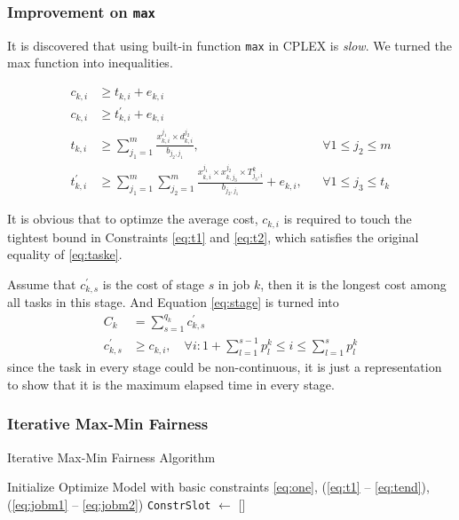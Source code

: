\documentclass[aspectratio=169]{beamer}
\begin{document}
\begin{frame}[allowframebreaks=0.8]
\frametitle{Improvement on \texttt{max}}
It is discovered that using built-in function \texttt{max} in CPLEX is \emph{slow}. We turned the max function into inequalities. 

\begin{align}
    c_{k,i} &\geq t_{k,i} + e_{k,i} \label{eq:t1}\\
    c_{k,i} &\geq t_{k,i}^\prime + e_{k,i} \label{eq:t2}\\
    t_{k,i} &\geq \sum_{j_1=1}^m \frac{x_{k,i}^{j_1}\times d_{k,i}^{j_2}}{b_{j_2,j_1}},&& \forall 1\leq j_2\leq m\\
    t_{k,i}^\prime &\geq \sum_{j_1=1}^m\sum_{j_2=1}^m \frac{x_{k,i}^{j_1}\times x_{k,j_3}^{j_2}\times T_{j_3,i}^k}{b_{j_2,j_1}} + e_{k,i},&& \forall 1\leq j_3\leq t_k\label{eq:tend}
\end{align}

It is obvious that to optimze the average cost, $c_{k,i}$ is required to touch the tightest bound in Constraints \eqref{eq:t1} and \eqref{eq:t2}, which satisfies the original equality of \eqref{eq:taske}.

Assume that $c^\prime_{k,s}$ is the cost of stage $s$ in job $k$, then it is the longest cost among all tasks in this stage. And Equation \eqref{eq:stage} is turned into
\begin{align}
    C_k &= \sum_{s=1}^{q_k} c^{\prime}_{k,s} \label{eq:jobm1}\\
    c^\prime_{k,s} &\geq c_{k,i},\quad \forall i: 1+\sum_{l=1}^{s-1} p_{l}^k \leq i \leq \sum_{l=1}^{s} p_{l}^k \label{eq:jobm2}
\end{align}
since the task in every stage could be non-continuous, it is just a representation to show that it is the maximum elapsed time in every stage.
\end{frame}

\begin{frame}
\frametitle{Iterative Max-Min Fairness}

\begin{algorithm}[H]
    \caption{Iterative Max-Min Fairness Algorithm}
    Initialize Optimize Model with basic constraints \eqref{eq:one}, (\ref{eq:t1} -- \ref{eq:tend}), (\ref{eq:jobm1} -- \ref{eq:jobm2})\;
    \texttt{ConstrSlot} $\leftarrow$ []\;
\end{algorithm}
\end{frame}
\end{document}
